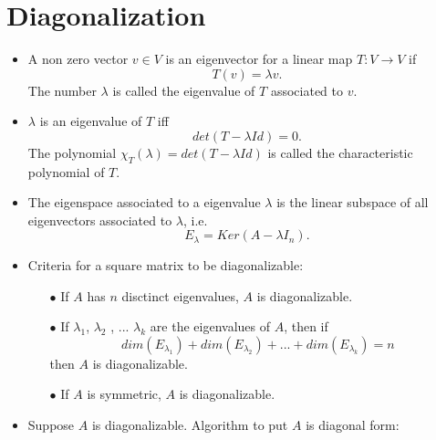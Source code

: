 \section{Diagonalization}
\begin{itemize}
\item A non zero vector $v\in V$ is an eigenvector for a linear map $T: V\rightarrow V$ if
\[T(v) = \lambda v.\]
The number $\lambda$ is called the eigenvalue of $T$ associated to $v$. 
\item $\lambda$ is an eigenvalue of $T$ iff \[det(T -\lambda Id) = 0.\]
The polynomial $\chi_T(\lambda)= det(T -\lambda Id)$ is called the characteristic polynomial of $T$. 

\item The eigenspace associated to a eigenvalue $\lambda $ is the linear subspace of all eigenvectors associated to $\lambda$, i.e.
\[E_\lambda = Ker (A-\lambda I_n).\]

\item Criteria for a square matrix to be diagonalizable:
\begin{itemize}
\item[$\bullet$] If $A$ has $n$ disctinct eigenvalues, $A$ is diagonalizable.
\item[$\bullet$] If $\lambda_1$, $\lambda_2$ , ... $\lambda_k$ are the eigenvalues of $A$, then if 
\[dim(E_{\lambda_1})+ dim(E_{\lambda_2}) +... +dim(E_{\lambda_k}) = n \]
then $A$ is diagonalizable.
\item[$\bullet$] If $A$ is symmetric, $A$ is diagonalizable.
\end{itemize}

\item Suppose $A$ is diagonalizable. Algorithm to put $A$ is diagonal form:\\
\ \\
\\
\\


\end{itemize}
